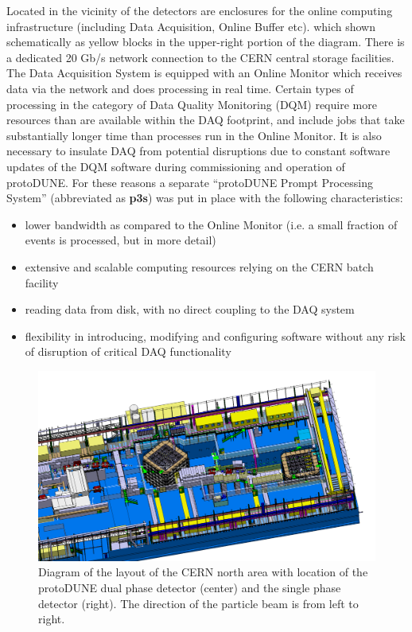 \documentclass{webofc}
\newcommand{\pd}{protoDUNE\xspace}
\begin{document}
 Located in the vicinity of the detectors
are enclosures for the online computing infrastructure (including Data Acquisition, Online Buffer etc). 
which shown schematically as yellow blocks in the upper-right portion of  the diagram.
There is a dedicated 20 Gb/s network connection to the CERN central storage facilities.
The Data Acquisition System is equipped with an Online Monitor which receives data via the network
and does processing in real time.
Certain types of processing in the category of Data Quality Monitoring (DQM)
require more resources than are available within the DAQ footprint, and include jobs that take substantially
longer time than processes run in the Online Monitor. It is also necessary to insulate DAQ from
potential disruptions due to constant software updates of the DQM software during commissioning
and operation of \pd.
For these reasons a separate ``\pd Prompt Processing System''
(abbreviated as \textbf{p3s}) was put in place \cite{eps} with the following characteristics:
\begin{itemize} 

\item lower bandwidth as compared to the Online Monitor (i.e. a small fraction of events is processed,
but in more detail)

\item extensive and scalable computing resources relying on the CERN batch facility

\item reading data from disk, with no direct coupling to the DAQ system

\item flexibility in introducing, modifying and configuring software without any risk of disruption of
critical DAQ functionality

\end{itemize}

\begin{figure}[tb]
\centering\includegraphics[width=1.0\textwidth]{figures/np02np04.png}
\caption{\label{fig:np02np04}Diagram of the layout of the CERN north area with
  location of the protoDUNE dual phase detector (center) and the single
  phase detector (right). The direction of the particle beam is from left to right.}
\end{figure}
\end{document}
